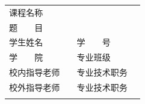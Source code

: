 \documentclass[a4paper, 11pt]{article}
\begin{document}
\begin{titlepage}

    \begin{center}
    \end{center}

    \begin{table}[!b]
        \fontsize{14pt}{0}\selectfont
        \begin{tabularx}{\textwidth}{lXlX}
            \rule{0pt}{36pt}
            课程名称 & \multicolumn{3}{l}{} \\
            \cline{2-4}
            \rule{0pt}{36pt}
            题　　目 & \multicolumn{3}{l}{} \\
            \cline{2-4}
            \rule{0pt}{36pt}
            学生姓名 & & \quad 学　　号 & \\
            \cline{2-2} \cline{4-4}
            \rule{0pt}{36pt}
            学　　院 & & \quad 专业班级 & \\
            \cline{2-2} \cline{4-4}
            \rule{0pt}{36pt}
            校内指导老师 & & \quad 专业技术职务 & \\
            \cline{2-2} \cline{4-4}
            \rule{0pt}{36pt}
            校外指导老师 & & \quad 专业技术职务 & \\
            \cline{2-2} \cline{4-4}
            \rule{0pt}{36pt}
        \end{tabularx}
    \end{table}

\end{titlepage}

\tableofcontents
\end{document}
